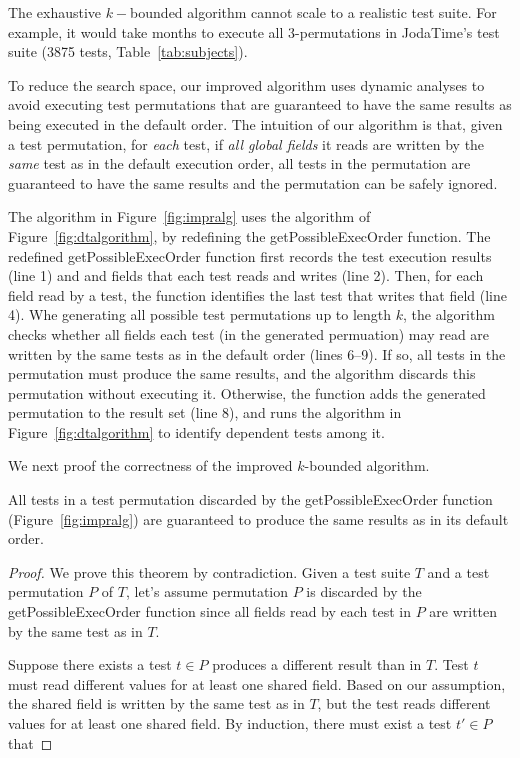 The exhaustive $k-$bounded algorithm cannot scale to a realistic test suite.
For example, it would take months to 
execute all 3-permutations
in JodaTime's test suite (3875 tests, Table~\ref{tab:subjects}).

To reduce the search space, our improved algorithm
uses dynamic analyses to avoid executing test
permutations that are guaranteed to have the
same results as being executed in the default order.
The intuition of our algorithm is that,
given a test permutation, for \textit{each}
test, if \textit{all global fields} it reads
are written by the \textit{same} test as
in the default execution order, all tests in
the permutation are guaranteed to
have the same results and the permutation can be safely ignored. 

The algorithm in Figure~\ref{fig:impralg} uses the
algorithm of Figure~\ref{fig:dtalgorithm}, by redefining
the getPossibleExecOrder function. The redefined
getPossibleExecOrder function first records
the test execution results (line 1) and
and fields that each test reads and writes (line 2).
Then, for each field read by a test,
the function identifies the last test that writes
that field (line 4).
Whe generating all possible test permutations
up to length $k$, the algorithm checks whether
all fields each test (in the generated permuation)
may read are written by the same tests as in the
default order (lines 6--9). If so, all tests in the permutation
must produce the same results, and the algorithm discards
this permutation without executing it. Otherwise,
the function adds the generated permutation to the result
set (line 8), and runs the algorithm in Figure~\ref{fig:dtalgorithm}
to identify dependent tests among it.


We next proof the correctness of the improved $k$-bounded algorithm.

\begin{theorem}
All tests in a test permutation discarded by the getPossibleExecOrder
function (Figure~\ref{fig:impralg}) are guaranteed to produce the same results as in its default order.
\end{theorem}

\begin{proof}
We prove this theorem by contradiction. Given a test
suite $T$ and a test permutation $P$ of $T$, let's assume
permutation $P$ is discarded by the getPossibleExecOrder function
since all fields read by each test in $P$ are written
by the same test as in $T$.


Suppose there exists a test $t \in P$ produces a different result
than in $T$. Test $t$ must read different values
for at least one shared field. Based on our assumption,
the shared field is written by the same test as in $T$,
but the test reads different values for at least
one shared field. By induction, there must exist
a test $t' \in P$ that 
\end{proof}

